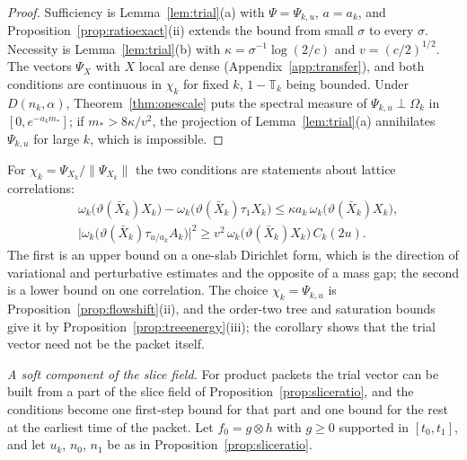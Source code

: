 \documentclass[11pt]{amsart}
\theoremstyle{definition}
\theoremstyle{remark}
\numberwithin{equation}{section}
\begin{document}
\begin{proof}
Sufficiency is Lemma~\ref{lem:trial}(a) with $\Psi=\Psi_{k,u}$, $a=a_k$, and
Proposition~\ref{prop:ratioexact}(ii) extends the bound from small $\sigma$ to
every $\sigma$. Necessity is Lemma~\ref{lem:trial}(b) with
$\kappa=\sigma^{-1}\log(2/c)$ and $v=(c/2)^{1/2}$. The vectors $\Psi_X$ with
$X$ local are dense (Appendix~\ref{app:transfer}), and both conditions are
continuous in $\chi_k$ for fixed $k$, $1-\mathbb T_k$ being bounded. Under
$D(n_k,\alpha)$, Theorem~\ref{thm:onescale} puts the spectral measure of
$\Psi_{k,u}\perp\Omega_k$ in $[0,e^{-a_km_*}]$; if $m_*>8\kappa/v^2$, the
projection of Lemma~\ref{lem:trial}(a) annihilates $\Psi_{k,u}$ for large $k$,
which is impossible.
\end{proof}

For $\chi_k=\Psi_{X_k}/\|\Psi_{X_k}\|$ the two conditions are statements about
lattice correlations:
\[
\begin{split}
&\omega_k\bigl(\vartheta(\bar X_k)X_k\bigr)-\omega_k\bigl(\vartheta(\bar
X_k)\tau_1X_k\bigr)\le\kappa a_k\,\omega_k\bigl(\vartheta(\bar X_k)X_k\bigr),\\
&\bigl|\omega_k\bigl(\vartheta(\bar X_k)\tau_{u/a_k}A_k\bigr)\bigr|^2\ge v^2\,
\omega_k\bigl(\vartheta(\bar X_k)X_k\bigr)\,C_k(2u).
\end{split}
\]
The first is an upper bound on a one-slab Dirichlet form, which is the
direction of variational and perturbative estimates and the opposite of a
mass gap; the second is a lower bound on one correlation. The choice
$\chi_k=\Psi_{k,u}$ is Proposition~\ref{prop:flowshift}(ii), and the order-two
tree and saturation bounds give it by Proposition~\ref{prop:treeenergy}(iii);
the corollary shows that the trial vector need not be the packet itself.

\emph{A soft component of the slice field.} For product packets the trial
vector can be built from a part of the slice field of
Proposition~\ref{prop:sliceratio}, and the conditions become one first-step
bound for that part and one bound for the rest at the earliest time of the
packet. Let $f_0=g\otimes h$ with $g\ge0$ supported in $[t_0,t_1]$, and let
$u_k$, $n_0$, $n_1$ be as in Proposition~\ref{prop:sliceratio}.
\end{document}
